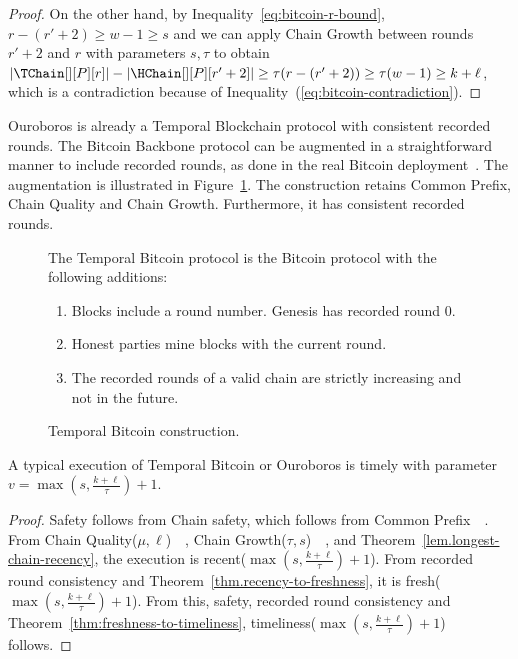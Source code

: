 \begin{proof}
  On the other hand, by Inequality~\ref{eq:bitcoin-r-bound}, $r - (r' + 2) \geq w - 1 \geq s$ and
  we can apply Chain Growth between rounds $r' + 2$ and $r$
  with parameters $s, \tau$ to obtain
  $|\TChain[][P][r]| - |\HChain[][P][r' + 2]| \geq \tau(r - (r' + 2)) \geq \tau (w - 1) \geq  k + \ell$,
  which is a contradiction because of Inequality~(\ref{eq:bitcoin-contradiction}).
  \Qed
\end{proof}

Ouroboros is already a Temporal Blockchain protocol with consistent recorded rounds.
The Bitcoin Backbone protocol can be augmented in a
straightforward manner to include recorded rounds, as done in the real Bitcoin deployment~\cite{mastering-bitcoin}.
The augmentation is illustrated in Figure~\ref{fig.temporal-backbone}.
The construction retains Common Prefix, Chain Quality and Chain Growth.
Furthermore, it has consistent recorded rounds.

\begin{figure}
  \begin{mdframed}
    The Temporal Bitcoin protocol is the Bitcoin protocol with
    the following additions:

    \begin{enumerate}
      \item Blocks include a round number. Genesis has recorded round $0$.
      \item Honest parties mine blocks with the current round.
      \item The recorded rounds of a valid chain are strictly increasing and not in the future.
    \end{enumerate}
  \end{mdframed}
  \caption{Temporal Bitcoin construction.}
  \label{fig.temporal-backbone}
\end{figure}

\begin{corollary}
  A typical execution of Temporal Bitcoin or Ouroboros is timely with parameter
  $v = \max(s, \frac{k + \ell}{\tau}) + 1$.
\end{corollary}
\begin{proof}
  Safety follows from Chain safety, which follows from Common Prefix~\cite[Theorem 15]{backbone}~\cite[Theorem 4.31]{ouroboros}.
  From Chain Quality($\mu,\ell$)~\cite[Theorem 16]{backbone}~\cite[Lemma 4.19]{ouroboros},
  Chain Growth($\tau, s$)~\cite[Theorem 12]{backbone}~\cite[Lemma 4.22]{ouroboros}, and Theorem~\ref{lem.longest-chain-recency},
  the execution is recent($\max(s, \frac{k + \ell}{\tau}) + 1$).
  From recorded round consistency and Theorem~\ref{thm.recency-to-freshness}, it is
  fresh($\max(s, \frac{k + \ell}{\tau}) + 1$).
  From this, safety, recorded round consistency and Theorem~\ref{thm:freshness-to-timeliness},
  timeliness($\max(s, \frac{k + \ell}{\tau}) + 1$) follows.
  \Qed
\end{proof}